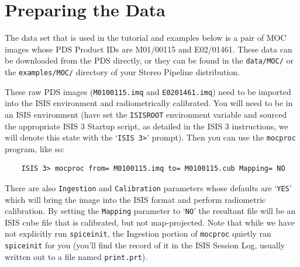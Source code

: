 \section{Preparing the Data}

The data set that is used in the tutorial and examples below is a
pair of \ac{MOC} \citep{1992JGR....97.7699M,2001JGR...10623429M}
images whose \ac{PDS} Product IDs are M01/00115 and E02/01461.
These data can be downloaded from the PDS directly, or they can be
found in the \texttt{data/MOC/} or the \texttt{examples/MOC/}
directory of your Stereo Pipeline distribution.

These raw \ac{PDS} images (\texttt{M0100115.imq} and \texttt{E0201461.imq})
need to be imported into the \ac{ISIS} environment and radiometrically
calibrated.  You will need to be in an \ac{ISIS} environment (have
set the \texttt{ISISROOT} environment variable and sourced the
appropriate \ac{ISIS} 3 Startup script, as detailed in the \ac{ISIS}
3 instructions, we will denote this state with the `\texttt{ISIS
3>}' prompt).  Then you can use the \texttt{mocproc} program, like
so:

\begin{verbatim}
    ISIS 3> mocproc from= M0100115.imq to= M0100115.cub Mapping= NO
\end{verbatim}
\noindent
There are also \texttt{Ingestion} and \texttt{Calibration} parameters
whose defaults are `\texttt{YES}' which will bring the image into
the \ac{ISIS} format and perform radiometric calibration.  By setting
the \texttt{Mapping} parameter to `\texttt{NO}' the resultant file
will be an \ac{ISIS} cube file that is calibrated, but not map-projected.
Note that while we have not explicitly run \texttt{spiceinit}, the
Ingestion portion of \texttt{mocproc} quietly ran \texttt{spiceinit}
for you (you'll find the record of it in the \ac{ISIS} Session Log,
usually written out to a file named \texttt{print.prt}).

